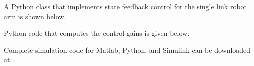 A Python class that implements state feedback control for the single link robot arm is shown below.


Python code that computes the control gains is given below.


Complete simulation code for Matlab, Python, and Simulink can be downloaded at .


